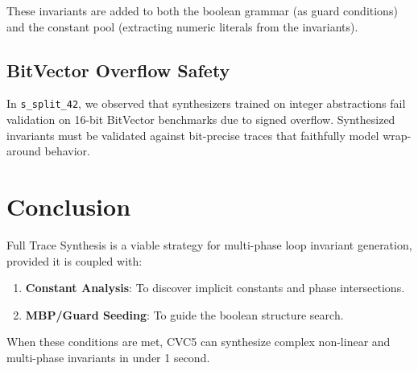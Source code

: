 \documentclass{article}
\begin{document}
These invariants are added to both the boolean grammar (as guard conditions) and the constant pool (extracting numeric literals from the invariants).

\subsection{BitVector Overflow Safety}
In \texttt{s\_split\_42}, we observed that synthesizers trained on integer abstractions fail validation on 16-bit BitVector benchmarks due to signed overflow. Synthesized invariants must be validated against bit-precise traces that faithfully model wrap-around behavior.

\section{Conclusion}
Full Trace Synthesis is a viable strategy for multi-phase loop invariant generation, provided it is coupled with:
\begin{enumerate}
    \item \textbf{Constant Analysis}: To discover implicit constants and phase intersections.
    \item \textbf{MBP/Guard Seeding}: To guide the boolean structure search.
\end{enumerate}
When these conditions are met, CVC5 can synthesize complex non-linear and multi-phase invariants in under 1 second.
\end{document}
